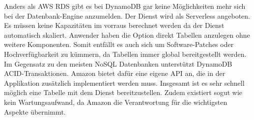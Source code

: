 Anders als AWS RDS gibt es bei DynamoDB gar keine Möglichkeiten mehr sich bei der Datenbank-Engine anzumelden. Der Dienst wird als Serverless angeboten.
Es müssen keine Kapazitäten im vorraus berechnet werden da der Dienst automatisch skaliert. Anwender haben die Option direkt Tabellen anzulegen ohne weitere
Komponenten. Somit entfällt es auch sich um Software-Patches oder Hochverfügbarkeit zu kümmern, da Tabellen immer global bereitgestellt werden.
Im Gegensatz zu den meisten NoSQL Datenbanken unterstützt DynamoDB ACID-Transaktionen. Amazon bietet dafür eine eigene API an, die in der Applikation zusätzlich
implementiert werden muss. Insgesamt ist es sehr schnell möglich eine Tabelle mit dem Dienst bereitzustellen. Zudem existiert sogut wie kein Wartungsaufwand,
da Amazon die Verantwortung für die wichtigsten Aspekte übernimmt.\cite[]{DynamoDB}


